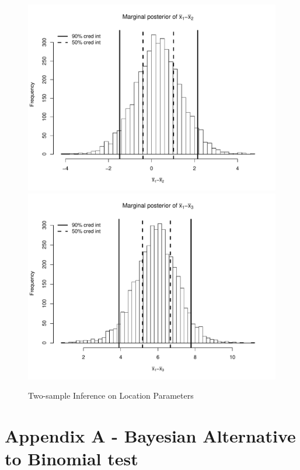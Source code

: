 \documentclass[12pt]{article}
\begin{document}
\begin{figure}[H]\caption[]{Two-sample Inference on Location Parameters}
\begin{minipage}{1\linewidth}
  \centering
\includegraphics[trim={0cm 0cm 0cm 0cm}, clip, scale=0.4]{../figs/norm2.pdf}
\includegraphics[trim={0cm 0cm 0cm 0cm}, clip, scale=0.4]{../figs/norm3.pdf}
\footnotesize
\end{minipage}
\end{figure}

\pagebreak

\section{Appendix A - Bayesian Alternative to Binomial test}
\end{document}
